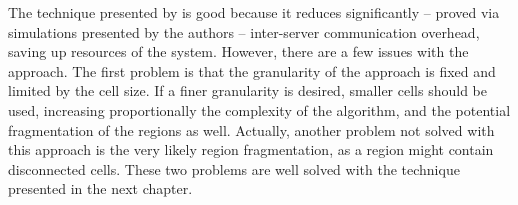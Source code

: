 The technique presented by \cite{bezerra2009lbs} is good because it reduces significantly -- proved via simulations presented by the authors -- inter-server communication overhead, saving up resources of the system. However, there are a few issues with the approach. The first problem is that the granularity of the approach is fixed and limited by the cell size. If a finer granularity is desired, smaller cells should be used, increasing proportionally the complexity of the algorithm, and the potential fragmentation of the regions as well. Actually, another problem not solved with this approach is the very likely region fragmentation, as a region might contain disconnected cells. These two problems are well solved with the technique presented in the next chapter.